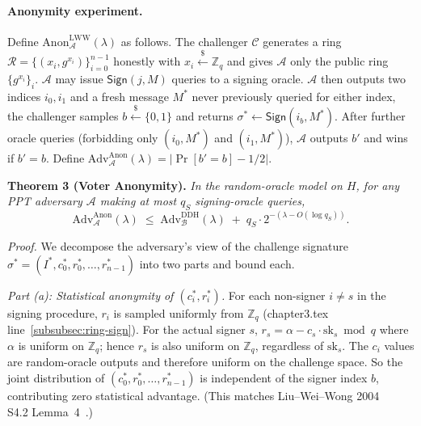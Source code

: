 \paragraph{Anonymity experiment.} Define $\mathrm{Anon}^{\mathrm{LWW}}_{\mathcal{A}}(\lambda)$ as follows. The challenger $\mathcal{C}$ generates a ring $\mathcal{R} = \{(x_i, g^{x_i})\}_{i=0}^{n-1}$ honestly with $x_i \stackrel{\$}{\leftarrow} \mathbb{Z}_q$ and gives $\mathcal{A}$ only the public ring $\{g^{x_i}\}_i$. $\mathcal{A}$ may issue $\mathsf{Sign}(j, M)$ queries to a signing oracle. $\mathcal{A}$ then outputs two indices $i_0, i_1$ and a fresh message $M^*$ never previously queried for either index, the challenger samples $b \stackrel{\$}{\leftarrow} \{0,1\}$ and returns $\sigma^* \leftarrow \mathsf{Sign}(i_b, M^*)$. After further oracle queries (forbidding only $(i_0, M^*)$ and $(i_1, M^*)$), $\mathcal{A}$ outputs $b'$ and wins if $b' = b$. Define $\mathrm{Adv}^{\mathrm{Anon}}_{\mathcal{A}}(\lambda) = |\Pr[b' = b] - 1/2|$.

\textbf{Theorem 3 (Voter Anonymity).} \textit{In the random-oracle model on $H$, for any PPT adversary $\mathcal{A}$ making at most $q_S$ signing-oracle queries,}
\begin{equation}
    \mathrm{Adv}^{\mathrm{Anon}}_{\mathcal{A}}(\lambda) \;\leq\; \mathrm{Adv}^{\mathrm{DDH}}_{\mathcal{B}}(\lambda) \;+\; q_S \cdot 2^{-(\lambda - O(\log q_S))}.
    \label{eq:t3-bound}
\end{equation}

\textit{Proof.} We decompose the adversary's view of the challenge signature $\sigma^* = (I^*, c_0^*, r_0^*, \ldots, r_{n-1}^*)$ into two parts and bound each.

\emph{Part (a): Statistical anonymity of $(c_i^*, r_i^*)$.} For each non-signer $i \neq s$ in the signing procedure, $r_i$ is sampled uniformly from $\mathbb{Z}_q$ (chapter3.tex line~\ref{subsubsec:ring-sign}). For the actual signer $s$, $r_s = \alpha - c_s \cdot \text{sk}_s \bmod q$ where $\alpha$ is uniform on $\mathbb{Z}_q$; hence $r_s$ is also uniform on $\mathbb{Z}_q$, regardless of $\text{sk}_s$. The $c_i$ values are random-oracle outputs and therefore uniform on the challenge space. So the joint distribution of $(c_0^*, r_0^*, \ldots, r_{n-1}^*)$ is independent of the signer index $b$, contributing zero statistical advantage. (This matches Liu--Wei--Wong 2004 \\S4.2 Lemma~4~\cite{liu2004}.)

